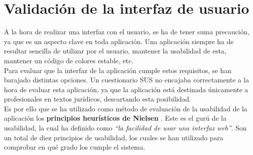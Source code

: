 \section{Validación de la interfaz de usuario}

A la hora de realizar una interfaz con el usuario, se ha de tener suma precaución, ya que es un aspecto clave en toda aplicación. Una aplicación siempre ha de resultar sencilla de utilizar por el usuario, mantener la usabilidad de esta, mantener un código de colores estable, etc.
\\

Para evaluar que la interfaz de la aplicación cumple estos requisitos, se han barajado distintas opciones. Un cuestionario SUS \cite{sus} no encajaba correctamente a la hora de evaluar esta aplicación, ya que la aplicación está destinada únicamente a profesionales en textos jurídicos, descartando esta posibilidad. 
\\

Es por ello que se ha utilizado como método de evaluación de la usabilidad de la aplicación los {\bf principios heurísticos de Nielsen} \cite{nielsen}. Este es el gurú de la usabilidad, la cual ha definido como {\it ``la facilidad de usar una interfaz web''}. Son un total de diez principios de usabilidad, los cuales se han utilizado para comprobar en qué grado los cumple el sistema.

